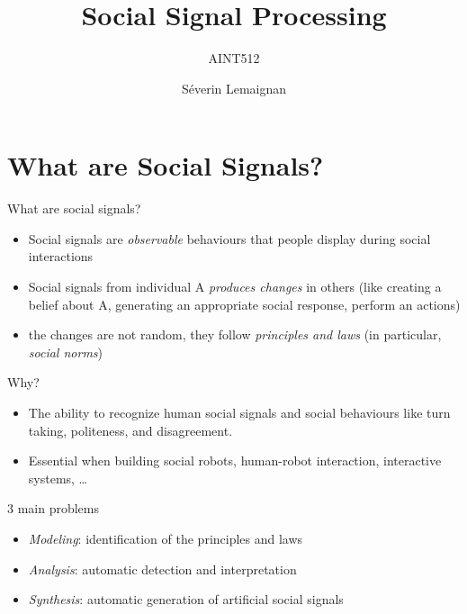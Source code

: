\documentclass[compress]{beamer}
\title{Social Signal Processing}
\subtitle{AINT512}
\date{}
\author{Séverin Lemaignan}
\institute{Centre for Neural Systems and Robotics\\{\bf Plymouth University}}
\makeatletter
\let\beamer@writeslidentry@miniframeson=\beamer@writeslidentry
\def\beamer@writeslidentry@miniframesoff{%
  \expandafter\beamer@ifempty\expandafter{\beamer@framestartpage}{}%
  {%
    \clearpage\beamer@notesactions%
  }
}
\newcommand*{\miniframeson}{\let\beamer@writeslidentry=\beamer@writeslidentry@miniframeson}
\newcommand*{\miniframesoff}{\let\beamer@writeslidentry=\beamer@writeslidentry@miniframesoff}
\makeatother
\begin{document}
\miniframesoff


\maketitle

\miniframeson

\section[Social signals?]{What are Social Signals?}



{

\begin{frame}{What are social signals?}


    \begin{itemize}
        \item<1-> Social signals are \emph{observable} behaviours that people
            display during social interactions
        \item<2-> Social signals from individual A \emph{produces changes} in others
            (like creating a belief about A, generating an appropriate social
            response, perform an actions)
        \item<3-> the changes are not random, they follow \emph{principles and
            laws} (in particular, \emph{social norms})

    \end{itemize}

\end{frame}
}

\begin{frame}{Why?}
\begin{itemize}

\item The ability to recognize human social signals and social behaviours
  like turn taking, politeness, and disagreement.
\item Essential when building social robots, human-robot interaction,
  interactive systems, \ldots{}
\end{itemize}

    \begin{exampleblock}{3 main problems}

    \begin{itemize}
        \item \emph{Modeling}: identification of the principles and laws
        \item \emph{Analysis}: automatic detection and interpretation
        \item \emph{Synthesis}: automatic generation of artificial social
            signals
    \end{itemize}

    \end{exampleblock}
\end{frame}
\end{document}
